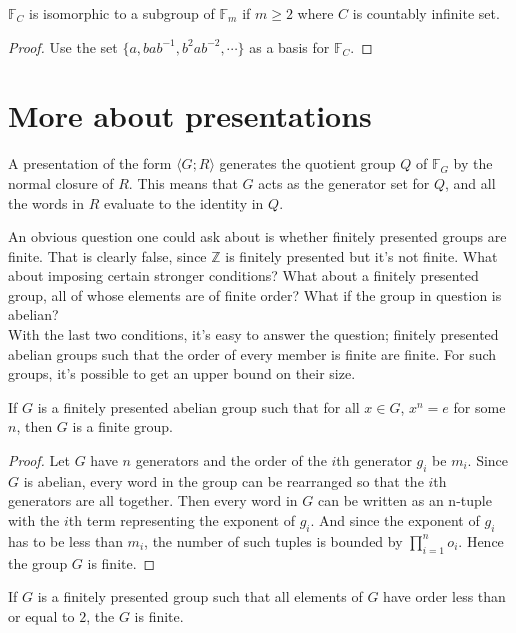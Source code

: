 \begin{cor}
$\mathbb{F}_C$ is isomorphic to a subgroup of $\mathbb{F}_m$ if $m \geq 2$ where $C$ is countably infinite set.
\end{cor}

\begin{proof}
Use the set $\{a, bab^{-1}, b^2ab^{-2}, \cdots\}$ as a basis for $\mathbb{F}_C$.
\end{proof}

\section{More about presentations}
A presentation of the form $\langle G;R \rangle$ generates the quotient group $Q$ of $\mathbb{F}_G$ by the normal closure of $R$. This means that $G$ acts as the generator set for $Q$, and all the words in $R$ evaluate to the identity in $Q$.

An obvious question one could ask about is whether finitely presented groups are finite. That is clearly false, since $\mathbb{Z}$ is finitely presented but it's not finite. What about imposing certain stronger conditions? What about a finitely presented group, all of whose elements are of finite order? What if the group in question is abelian?\cite{baumslag}\\
With the last two conditions, it's easy to answer the question; finitely presented abelian groups such that the order of every member is finite are finite. For such groups, it's possible to get an upper bound on their size.

\begin{thm}\label{burn}
If $G$ is a finitely presented abelian group such that for all $x \in G$, $x^n=e$ for some $n$, then $G$ is a finite group.
\end{thm}

\begin{proof}
Let $G$ have $n$ generators and the order of the $i$th generator $g_i$ be $m_i$. Since $G$ is abelian, every word in the group can be rearranged so that the $i$th generators are all together. Then every word in $G$ can be written as an n-tuple with the $i$th term representing the exponent of $g_i$. And since the exponent of $g_i$ has to be less than $m_i$, the number of such tuples is bounded by $\prod_{i=1}^{n}o_i$. Hence the group $G$ is finite.
\end{proof}

\begin{cor}
If $G$ is a finitely presented group such that all elements of $G$ have order less than or equal to $2$, the $G$ is finite.
\end{cor}

